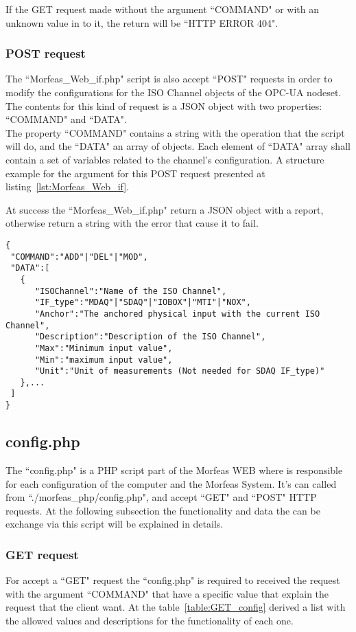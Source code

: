 If the GET request made without the argument ``COMMAND" or with an unknown value in to it, the return will be ``HTTP ERROR 404".

\subsubsection{POST request}
The ``Morfeas\_Web\_if.php" script is also accept ``POST" requests in order to modify the configurations for the ISO Channel objects of the OPC-UA nodeset.
The contents for this kind of request is a JSON object with two properties: ``COMMAND" and ``DATA".\\
The property ``COMMAND" contains a string with the operation that the script will do, and the ``DATA" an array of objects.
Each element of ``DATA" array shall contain a set of variables related to the channel's configuration.
A structure example for the argument for this POST request presented at listing~\ref{lst:Morfeas_Web_if}.
\par At success the ``Morfeas\_Web\_if.php" return a JSON object with a report, otherwise return a string with the error that cause it to fail.
\newpage
\begin{lstlisting}[frame=single,caption=Example for argument of POST request for Morfeas\_Web\_if.php,label=lst:Morfeas_Web_if]
{
 "COMMAND":"ADD"|"DEL"|"MOD",
 "DATA":[
   {
      "ISOChannel":"Name of the ISO Channel",
      "IF_type":"MDAQ"|"SDAQ"|"IOBOX"|"MTI"|"NOX",
      "Anchor":"The anchored physical input with the current ISO Channel",
      "Description":"Description of the ISO Channel",
      "Max":"Minimum input value",
      "Min":"maximum input value",
      "Unit":"Unit of measurements (Not needed for SDAQ IF_type)"
   },...
 ]
}
\end{lstlisting}

\subsection{config.php}
The ``config.php" is a PHP script part of the Morfeas WEB where is responsible for each configuration of the computer and the Morfeas System. It's can called from ``./morfeas\_php/config.php",
and accept ``GET" and ``POST" HTTP requests. At the following subsection the functionality and data the can be exchange via this script will be explained in details.

\subsubsection{GET request}
For accept a ``GET" request the ``config.php" is required to received the request with the argument ``COMMAND" that have a specific value that explain the request that the client want.
At the table~\ref{table:GET_config} derived a list with the allowed values and descriptions for the functionality of each one.

